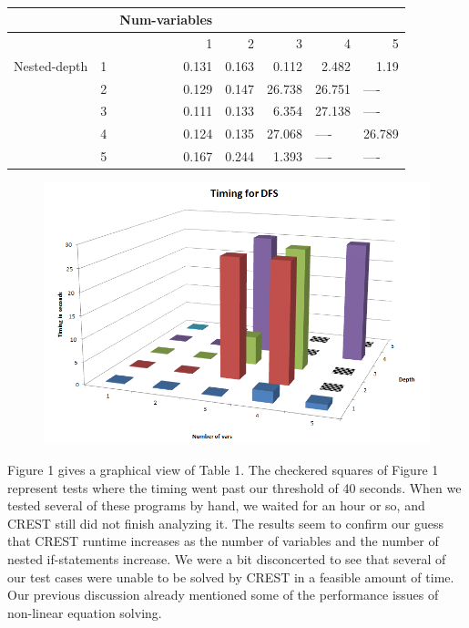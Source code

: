\documentclass[oribibl]{llncs}
\begin{document}
\begin{table}[htbp]
\caption{}
\begin{center}
\begin{tabular}{|l|r|r|r|r|r|l|}
\hline
 & \multicolumn{1}{l|}{} & \multicolumn{1}{l|}{Num-variables} & \multicolumn{1}{l|}{} & \multicolumn{1}{l|}{} & \multicolumn{1}{l|}{} &  \\ \hline
 & \multicolumn{1}{l|}{} & 1 & 2 & 3 & 4 & \multicolumn{1}{r|}{5} \\ \hline
Nested-depth & 1 & 0.131 & 0.163 & 0.112 & 2.482 & \multicolumn{1}{r|}{1.19} \\ \hline
 & 2 & 0.129 & 0.147 & 26.738 & 26.751 & ---- \\ \hline
 & 3 & 0.111 & 0.133 & 6.354 & 27.138 & ---- \\ \hline
 & 4 & 0.124 & 0.135 & 27.068 & \multicolumn{1}{l|}{----} & \multicolumn{1}{r|}{26.789} \\ \hline
 & 5 & 0.167 & 0.244 & 1.393 & \multicolumn{1}{l|}{----} & ---- \\ \hline
\end{tabular}
\end{center}
\label{DFS timings (in seconds)}
\end{table}


\begin{figure}[!t]
\centering
\includegraphics[width=13cm]{dfs_timings}
\caption{}
\label{figure:motivation}
\end{figure}

Figure 1 gives a graphical view of Table 1. The checkered squares of Figure 1 represent tests where the timing went past our threshold of 40 seconds. When we tested several of these programs by hand, we waited for an hour or so, and CREST still did not finish analyzing it. The results seem to confirm our guess that CREST runtime increases as the number of variables and the number of nested if-statements increase. We were a bit disconcerted to see that several of our test cases were unable to be solved by CREST in a feasible amount of time. Our previous discussion already mentioned some of the performance issues of non-linear equation solving.
\end{document}
